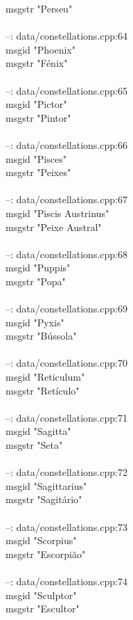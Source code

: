 \documentclass[10pt]{article}
\begin{document}
msgstr "Perseu"\\
\\
--: data/constellations.cpp:64\\
msgid "Phoenix"\\
msgstr "Fénix"\\
\\
--: data/constellations.cpp:65\\
msgid "Pictor"\\
msgstr "Pintor"\\
\\
--: data/constellations.cpp:66\\
msgid "Pisces"\\
msgstr "Peixes"\\
\\
--: data/constellations.cpp:67\\
msgid "Piscis Austrinus"\\
msgstr "Peixe Austral"\\
\\
--: data/constellations.cpp:68\\
msgid "Puppis"\\
msgstr "Popa"\\
\\
--: data/constellations.cpp:69\\
msgid "Pyxis"\\
msgstr "Bússola"\\
\\
--: data/constellations.cpp:70\\
msgid "Reticulum"\\
msgstr "Retículo"\\
\\
--: data/constellations.cpp:71\\
msgid "Sagitta"\\
msgstr "Seta"\\
\\
--: data/constellations.cpp:72\\
msgid "Sagittarius"\\
msgstr "Sagitário"\\
\\
--: data/constellations.cpp:73\\
msgid "Scorpius"\\
msgstr "Escorpião"\\
\\
--: data/constellations.cpp:74\\
msgid "Sculptor"\\
msgstr "Escultor"\\
\end{document}
